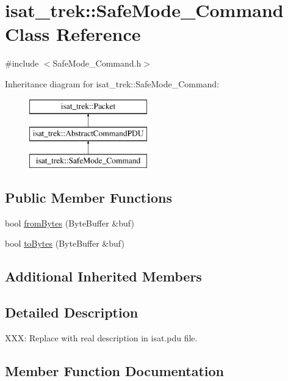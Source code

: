 \hypertarget{classisat__trek_1_1_safe_mode___command}{}\section{isat\+\_\+trek\+:\+:Safe\+Mode\+\_\+\+Command Class Reference}
\label{classisat__trek_1_1_safe_mode___command}


{\ttfamily \#include $<$Safe\+Mode\+\_\+\+Command.\+h$>$}

Inheritance diagram for isat\+\_\+trek\+:\+:Safe\+Mode\+\_\+\+Command\+:\begin{figure}[H]
\begin{center}
\leavevmode
\includegraphics[height=3.000000cm]{classisat__trek_1_1_safe_mode___command}
\end{center}
\end{figure}
\subsection*{Public Member Functions}
\begin{DoxyCompactItemize}
\item 
bool \hyperlink{classisat__trek_1_1_safe_mode___command_a402d7d88e693a73a09323e8fac698a54}{from\+Bytes} (Byte\+Buffer \&buf)
\item 
bool \hyperlink{classisat__trek_1_1_safe_mode___command_ad9688d75bc24e7474eef932cc7dcc180}{to\+Bytes} (Byte\+Buffer \&buf)
\end{DoxyCompactItemize}
\subsection*{Additional Inherited Members}


\subsection{Detailed Description}
X\+XX\+: Replace with real description in isat.\+pdu file. 

\subsection{Member Function Documentation}
